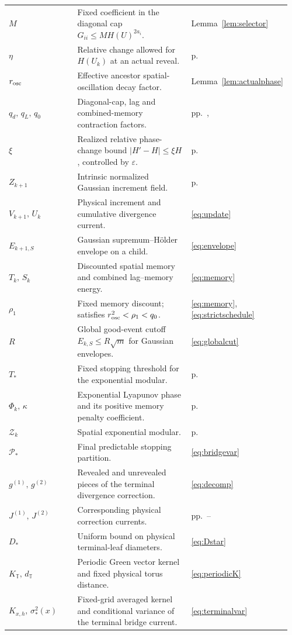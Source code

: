 \documentclass[11pt]{article}
\theoremstyle{definition}
\theoremstyle{remark}
\numberwithin{equation}{section}
\newcommand{\T}{\mathbb T}
\newcommand{\pr}{\mathcal P}
\begin{document}
{\begin{longtable}{@{}p{0.285\linewidth}p{0.535\linewidth}p{0.14\linewidth}@{}}
$M$ & Fixed coefficient in the diagonal cap $G_{ii}\le M H(U)^{2a_i}$. & Lemma~\ref{lem:selector}\\
$\eta$ & Relative change allowed for $H(U_k)$ at an actual reveal. & p.~\pageref{not:relativephase}\\
$r_{\rm osc}$ & Effective ancestor spatial-oscillation decay factor. & Lemma~\ref{lem:actualphase}\\
$q_d,\,q_L,\,q_0$ & Diagonal-cap, lag and combined-memory contraction factors. & pp.~\pageref{not:qd},\pageref{not:qL}\\
$\xi$ & Realized relative phase-change bound $|H'-H|\le\xi H$, controlled by $\varepsilon$. & p.~\pageref{not:xi}\\
$Z_{k+1}$ & Intrinsic normalized Gaussian increment field. & p.~\pageref{not:intrinsicgauss}\\
$V_{k+1},\,U_k$ & Physical increment and cumulative divergence current. & \eqref{eq:update}\\
$E_{k+1,S}$ & Gaussian supremum--Hölder envelope on a child. & \eqref{eq:envelope}\\
$T_k,\,S_k$ & Discounted spatial memory and combined lag--memory energy. & \eqref{eq:memory}\\
$\rho_1$ & Fixed memory discount; satisfies $r_{\rm osc}^2<\rho_1<q_0$. & \eqref{eq:memory}, \eqref{eq:strictschedule}\\
$R$ & Global good-event cutoff $E_{k,S}\le R\sqrt m$ for Gaussian envelopes. & \eqref{eq:globalcut}\\
$T_*$ & Fixed stopping threshold for the exponential modular. & p.~\pageref{not:modularfirst}\\
$\Phi_k,\,\kappa$ & Exponential Lyapunov phase and its positive memory penalty coefficient. & p.~\pageref{not:lyapunovfirst}\\
$\mathcal Z_k$ & Spatial exponential modular. & p.~\pageref{not:modularfirst}\\
$\pr_*$ & Final predictable stopping partition. & \eqref{eq:bridgevar}\\
$g^{(1)},\,g^{(2)}$ & Revealed and unrevealed pieces of the terminal divergence correction. & \eqref{eq:decomp}\\
$J^{(1)},\,J^{(2)}$ & Corresponding physical correction currents. & pp.~\pageref{not:terminalcurrents}--\pageref{not:periodicgreen}\\
$D_*$ & Uniform bound on physical terminal-leaf diameters. & \eqref{eq:Dstar}\\
$K_{\T},\,d_{\T}$ & Periodic Green vector kernel and fixed physical torus distance. & \eqref{eq:periodicK}\\
$K_{x,h},\,\sigma_*^2(x)$ & Fixed-grid averaged kernel and conditional variance of the terminal bridge current. & \eqref{eq:terminalvar}\\
\end{longtable}
}
\end{document}
